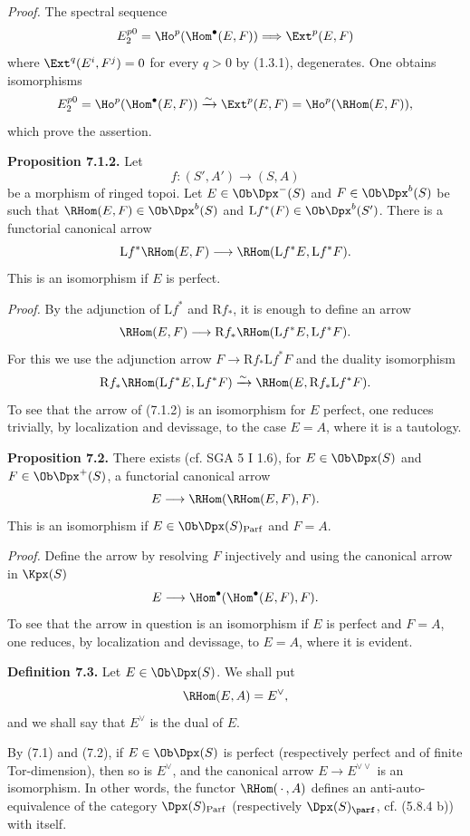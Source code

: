 \documentclass[11pt]{article}
\newcommand{\Parf}{\operatorname{Parf}}
\begin{document}
\emph{Proof.} The spectral sequence
\[
  E_2^{p0}=\Ho^p(\Hom^\bullet(E,F))
  \Longrightarrow \Ext^p(E,F)
\]
where \(\Ext^q(E^i,F^j)=0\) for every \(q>0\) by (1.3.1), degenerates. One obtains isomorphisms
\[
  E_2^{p0}=\Ho^p(\Hom^\bullet(E,F))
  \xrightarrow{\sim}\Ext^p(E,F)=\Ho^p(\RHom(E,F)),
\]
which prove the assertion.

\textbf{Proposition 7.1.2.} Let
\[
  f:(S',A')\longrightarrow(S,A)
\]
be a morphism of ringed topoi. Let \(E\in\Ob\Dpx^-(S)\) and \(F\in\Ob\Dpx^b(S)\) be such that \(\RHom(E,F)\in\Ob\Dpx^b(S)\) and \(\mathrm Lf^*(F)\in\Ob\Dpx^b(S')\). There is a functorial canonical arrow
\[
  \mathrm Lf^*\RHom(E,F)
  \longrightarrow
  \RHom(\mathrm Lf^*E,\mathrm Lf^*F).
\]
This is an isomorphism if \(E\) is perfect.

\emph{Proof.} By the adjunction of \(\mathrm Lf^*\) and \(\mathrm Rf_*\), it is enough to define an arrow
\[
  \RHom(E,F)
  \longrightarrow
  \mathrm Rf_*\RHom(\mathrm Lf^*E,\mathrm Lf^*F).
\]
For this we use the adjunction arrow \(F\to\mathrm Rf_*\mathrm Lf^*F\) and the duality isomorphism
\[
  \mathrm Rf_*\RHom(\mathrm Lf^*E,\mathrm Lf^*F)
  \xrightarrow{\sim}
  \RHom(E,\mathrm Rf_*\mathrm Lf^*F).
\]
To see that the arrow of (7.1.2) is an isomorphism for \(E\) perfect, one reduces trivially, by localization and devissage, to the case \(E=A\), where it is a tautology.

\textbf{Proposition 7.2.} There exists (cf. SGA 5 I 1.6), for \(E\in\Ob\Dpx(S)\) and \(F\in\Ob\Dpx^+(S)\), a functorial canonical arrow
\[
  E\longrightarrow\RHom(\RHom(E,F),F).
\]
This is an isomorphism if \(E\in\Ob\Dpx(S)_{\Parf}\) and \(F=A\).

\emph{Proof.} Define the arrow by resolving \(F\) injectively and using the canonical arrow in \(\Kpx(S)\)
\[
  E\longrightarrow \Hom^\bullet(\Hom^\bullet(E,F),F).
\]
To see that the arrow in question is an isomorphism if \(E\) is perfect and \(F=A\), one reduces, by localization and devissage, to \(E=A\), where it is evident.

\textbf{Definition 7.3.} Let \(E\in\Ob\Dpx(S)\). We shall put
\[
  \RHom(E,A)=E^\vee,
\]
and we shall say that \(E^\vee\) is the dual of \(E\).

By (7.1) and (7.2), if \(E\in\Ob\Dpx(S)\) is perfect (respectively perfect and of finite Tor-dimension), then so is \(E^\vee\), and the canonical arrow \(E\to E^{\vee\vee}\) is an isomorphism. In other words, the functor \(\RHom(\,\cdot\,,A)\) defines an anti-auto-equivalence of the category \(\Dpx(S)_{\Parf}\) (respectively \(\Dpx(S)_{\parf}\), cf. (5.8.4 b)) with itself.
\end{document}
